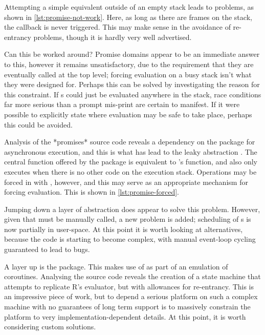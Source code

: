Attempting a simple equivalent outside of an empty stack leads to problems, as shown in \cref{lst:promise-not-work}.
Here, as long as there are frames on the stack, the  callback is never triggered.
This may make sense in the avoidance of re-entrancy problems, though it is hardly very well advertised.


Can this be worked around?
Promise domains appear to be an immediate answer to this, however it remains unsatisfactory, due to the requirement that they are eventually called at the top level; forcing evaluation on a busy stack isn't what they were designed for.
Perhaps this can be solved by investigating the reason for this constraint.
If s could just be evaluated anywhere in the stack, race conditions far more serious than a prompt mis-print are certain to manifest.
If it were possible to explicitly state where evaluation may be safe to take place, perhaps this could be avoided.

Analysis of the *promises* source code reveals a dependency on the  package for asynchronous execution, and this is what has lead to the leaky abstraction \cite{chang2021later}.
The central  function offered by the package is equivalent to 's  function, and also only executes when there is no other \R{} code on the execution stack.
Operations may be forced in  with , however, and this may serve as an appropriate mechanism for forcing evaluation.
This is shown in \cref{lst:promise-forced}.


Jumping down a layer of abstraction does appear to solve this problem.
However, given that  must be manually called, a new problem is added; scheduling of s is now partially in user-space.
At this point it is worth looking at alternatives, because the code is starting to become complex, with manual event-loop cycling guaranteed to lead to bugs.

A layer up is the  package\cite{henry21coro}.
This makes use of  as part of an emulation of coroutines.
Analysing the source code reveals the creation of a state machine that attempts to replicate R's evaluator, but with allowances for re-entrancy.
This is an impressive piece of work, but to depend a serious platform on such a complex machine with no guarantees of long term support is to massively constrain the platform to very implementation-dependent details.
At this point, it is worth considering custom solutions.

